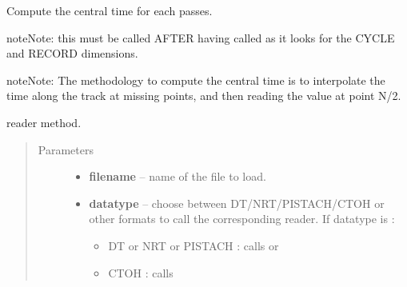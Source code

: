\documentclass[letterpaper,10pt,english]{sphinxmanual}
\begin{document}
\begin{fulllineitems}
\begin{fulllineitems}
\end{fulllineitems}


\begin{fulllineitems}
\label{altimetry.data:altimetry.data.alti_data.pass_time}
Compute the central time for each passes.

\begin{notice}{note}{Note:}
this must be called AFTER having called {\hyperref[altimetry.data:altimetry.data.alti_data.reorder]{}} as it looks for the CYCLE and RECORD dimensions.
\end{notice}

\begin{notice}{note}{Note:}
The methodology to compute the central time is to interpolate the time along the track at missing points, and then reading the value at point N/2.
\end{notice}

\end{fulllineitems}


\begin{fulllineitems}
\label{altimetry.data:altimetry.data.alti_data.read}
reader method.
\begin{quote}\begin{description}
\item[{Parameters}] \leavevmode\begin{itemize}
\item {} 
\textbf{filename} -- name of the file to load.

\item {} 
\textbf{datatype} -- 
choose between DT/NRT/PISTACH/CTOH or other formats to call the corresponding reader. If datatype is :
\begin{itemize}
\item {} 
DT or NRT or PISTACH : calls {\hyperref[altimetry.data:altimetry.data.alti_data.read_sla]{}} or {\hyperref[altimetry.data:altimetry.data.alti_data.read_slaext]{}}

\item {} 
CTOH : calls {\hyperref[altimetry.data:altimetry.data.alti_data.read_CTOH]{}}


\end{itemize}
\end{itemize}
\end{description}
\end{quote}
\end{fulllineitems}
\end{fulllineitems}
\end{document}
